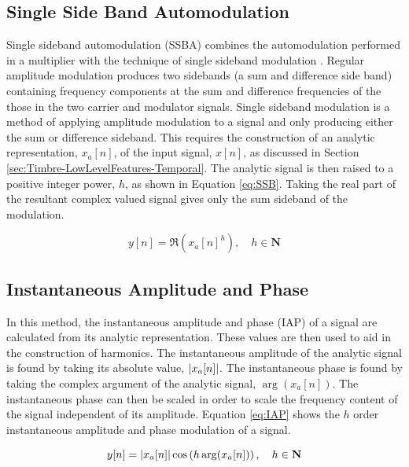 	\subsection{Single Side Band Automodulation}
	\label{sec:Excitation-Methods-SSBA}
		Single sideband automodulation (SSBA) combines the automodulation performed in a multiplier with the
		technique of single sideband modulation \citep{corinthios2009signals}. Regular amplitude modulation produces
		two sidebands (a sum and difference side band) containing frequency components at the sum and difference
		frequencies of the those in the two carrier and modulator signals. Single sideband modulation is a method of
		applying amplitude modulation to a signal and only producing either the sum or difference sideband. This
		requires the construction of an analytic representation, $x_{a}[n]$, of the input signal, $x[n]$, as
		discussed in Section \ref{sec:Timbre-LowLevelFeatures-Temporal}. The analytic signal is then raised to a
		positive integer power, $h$, as shown in Equation \ref{eq:SSB}. Taking the real part of the resultant
		complex valued signal gives only the sum sideband of the modulation.

		\begin{equation}
			y[n] = \Re \left( x_{a}[n]^{h} \right), \quad h \in \textbf{N}
			\label{eq:SSB}
		\end{equation}

	\subsection{Instantaneous Amplitude and Phase}
	\label{sec:Excitation-Methods-IAP}
		In this method, the instantaneous amplitude and phase (IAP) of a signal are calculated from its analytic
		representation. These values are then used to aid in the construction of harmonics. The instantaneous
		amplitude of the analytic signal is found by taking its absolute value, $\left|x_{a}[n]\right|$. The instantaneous
		phase is found by taking the complex argument of the analytic signal, $\arg(x_{a}[n])$. The instantaneous
		phase can then be scaled in order to scale the frequency content of the signal independent of its amplitude.
		Equation \ref{eq:IAP} shows the $h$ order instantaneous amplitude and phase modulation of a
		signal.

		\begin{equation}
			y[n] = \left|x_{a}[n]\right| \cos \left( h\arg(x_{a}[n]) \right), \quad h \in \textbf{N}
			\label{eq:IAP}
		\end{equation}

